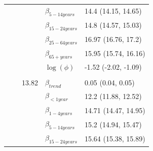 \documentclass[a4paper,twoside,11pt]{report} %
\theoremstyle{definition}
\theoremstyle{definition}
\theoremstyle{definition}
\theoremstyle{definition}
\theoremstyle{remark}
\begin{document}
\begin{longtable}[t]{llrll}
\hspace{1em}\hspace{1em} &  &  & $\beta_{5-14 years}$ & 14.4 (14.15, 14.65)\\

\hspace{1em}\hspace{1em} &  &  & $\beta_{15-24 years}$ & 14.8 (14.57, 15.03)\\

\hspace{1em}\hspace{1em} &  &  & $\beta_{25-64 years}$ & 16.97 (16.76, 17.2)\\

\hspace{1em}\hspace{1em} &  &  & $\beta_{65+ years}$ & 15.95 (15.74, 16.16)\\

\hspace{1em}\hspace{1em} &  &  & $\log(\phi)$ & -1.52 (-2.02, -1.09)\\
\cmidrule{2-5}
\addlinespace[0.3em]
\multicolumn{5}{l}{\begin{math}\log(\lambda_{it})=\beta(ageGroup_{i})+\beta_{trend} t +\log(n_{it})\end{math}}\\
\hspace{1em}\hspace{1em} &  & 13.82 & $\beta_{trend}$ & 0.05 (0.04, 0.05)\\

\hspace{1em}\hspace{1em} &  &  & $\beta_{<1 year}$ & 12.2 (11.88, 12.52)\\

\hspace{1em}\hspace{1em} &  &  & $\beta_{1-4 years}$ & 14.71 (14.47, 14.95)\\

\hspace{1em}\hspace{1em} &  &  & $\beta_{5-14 years}$ & 15.2 (14.94, 15.47)\\

\hspace{1em}\hspace{1em} &  &  & $\beta_{15-24 years}$ & 15.64 (15.38, 15.89)\\


\end{longtable}
\end{document}
